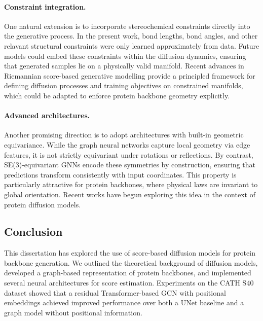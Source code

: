 \documentclass[a4paper,12pt]{article}
\begin{document}
\paragraph{Constraint integration.}
One natural extension is to incorporate stereochemical constraints directly into the generative process. In the present work, bond lengths, bond angles, and other relavant structural constraints were only learned approximately from data. Future models could embed these constraints within the diffusion dynamics, ensuring that generated samples lie on a physically valid manifold. Recent advances in Riemannian score-based generative modelling \citep{debortoliRiemannianScoreBasedGenerative2022,huang2022RiemannianDiffusionModels,chungImprovingDiffusionModels2022} provide a principled framework for defining diffusion processes and training objectives on constrained manifolds, which could be adapted to enforce protein backbone geometry explicitly. 

\paragraph{Advanced architectures.}
Another promising direction is to adopt architectures with built-in geometric equivariance. While the graph neural networks capture local geometry via edge features, it is not strictly equivariant under rotations or reflections. By contrast, SE(3)-equivariant GNNs \citep{thomasTensorFieldNetworks2018,weiler3DSteerableCNNs2018,kondorClebschGordanNetsFully2018,geiger2022E3nnEuclideanNeural,geiger2025EuclideanNeuralNetworks} encode these symmetries by construction, ensuring that predictions transform consistently with input coordinates. This property is particularly attractive for protein backbones, where physical laws are invariant to global orientation. Recent works \citep{yimDiffusionModelsProtein2024} have begun exploring this idea in the context of protein diffusion models.

\subsection{Conclusion}\label{subsec:conclusion}
This dissertation has explored the use of score-based diffusion models for protein backbone generation. We outlined the theoretical background of diffusion models, developed a graph-based representation of protein backbones, and implemented several neural architectures for score estimation. Experiments on the CATH S40 dataset showed that a residual Transformer-based GCN with positional embeddings achieved improved performance over both a UNet baseline and a graph model without positional information.
\end{document}
